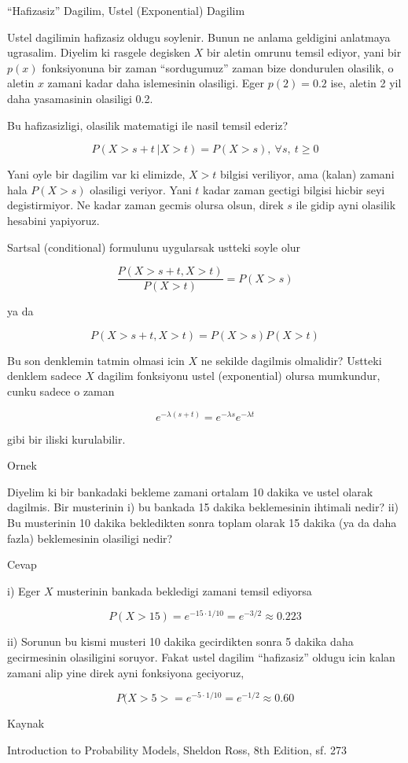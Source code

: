 \documentclass[12pt,fleqn]{article}
\begin{document}
``Hafizasiz'' Dagilim, Ustel (Exponential) Dagilim

Ustel dagilimin hafizasiz oldugu soylenir. Bunun ne anlama geldigini
anlatmaya ugrasalim. Diyelim ki rasgele degisken $X$ bir aletin omrunu
temsil ediyor, yani bir $p(x)$ fonksiyonuna bir zaman ``sordugumuz'' zaman
bize dondurulen olasilik, o aletin $x$ zamani kadar daha islemesinin
olasiligi. Eger $p(2) = 0.2$ ise, aletin 2 yil daha yasamasinin olasiligi
0.2. 

Bu hafizasizligi, olasilik matematigi ile nasil temsil ederiz?

\[ P( X>s+t \ | X>t ) =  P(X>s) , \ \forall s, \ t \ge 0 \]

Yani oyle bir dagilim var ki elimizde, $X>t$ bilgisi veriliyor, ama (kalan)
zamani hala $P(X>s)$ olasiligi veriyor. Yani $t$ kadar zaman gectigi 
bilgisi hicbir seyi degistirmiyor. Ne kadar zaman gecmis olursa olsun,
direk $s$ ile gidip ayni olasilik hesabini yapiyoruz. 

Sartsal (conditional) formulunu uygularsak ustteki soyle olur

\[  \frac{P( X>s+t,  X>t )}{P(X>t)} = P(X>s)  \]

ya da

\[  P( X>s+t,  X>t ) = P(X>s)P(X>t) \]

Bu son denklemin tatmin olmasi icin $X$ ne sekilde dagilmis olmalidir?
Ustteki denklem sadece $X$ dagilim fonksiyonu ustel (exponential) olursa
mumkundur, cunku sadece o zaman

\[ e^{-\lambda(s+t)}  = e^{-\lambda s} e^{-\lambda t}\]

gibi bir iliski kurulabilir. 

Ornek

Diyelim ki bir bankadaki bekleme zamani ortalam 10 dakika ve ustel olarak
dagilmis. Bir musterinin i) bu bankada 15 dakika beklemesinin ihtimali
nedir? ii) Bu musterinin 10 dakika bekledikten sonra toplam olarak 15
dakika (ya da daha fazla) beklemesinin olasiligi nedir? 

Cevap

i) Eger $X$ musterinin bankada bekledigi zamani temsil ediyorsa

\[ P(X>15) = e^{-15 \cdot 1/10} = e^{-3/2} \approx 0.223 \]

ii) Sorunun bu kismi musteri 10 dakika gecirdikten sonra 5 dakika daha
gecirmesinin olasiligini soruyor. Fakat ustel dagilim ``hafizasiz'' oldugu
icin kalan zamani alip yine direk ayni fonksiyona geciyoruz, 

\[ P(X>5> = e^{-5 \cdot 1/10} = e^{-1/2} \approx 0.60\]

Kaynak

Introduction to Probability Models, Sheldon Ross, 8th Edition, sf. 273
\end{document}
